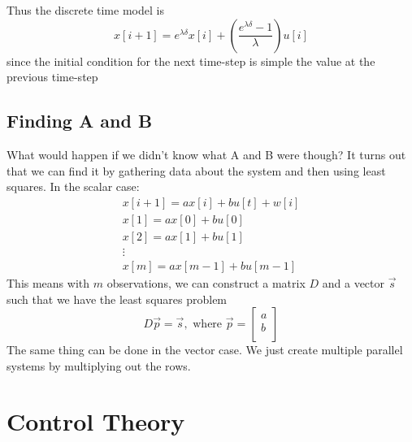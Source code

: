 \documentclass{article}
\begin{document}
Thus the discrete time model is
$$x[i+1]=e^{\lambda \delta}x[i]+\left(
    \frac{e^{\lambda \delta}-1}{\lambda}\right) u[i]$$
since the initial condition for the next time-step is simple the value at the previous time-step

\subsection{Finding A and B}
What would happen if we didn't know what A and B were though? It turns out that we can find it by gathering data about the system and then using least squares.
In the scalar case:
\[
    \begin{array}{c}
        x[i+1]=ax[i]+bu[t]+w[i]\\
        x[1]=ax[0]+bu[0]\\
        x[2]=ax[1]+bu[1]\\
        \vdots\\
        x[m]=ax[m-1]+bu[m-1]
    \end{array}
\]
This means with $m$ observations, we can construct a matrix $D$ and a vector $\vec{s}$ such that we have the least squares problem
\[
    D\vec{p}=\vec{s},\text{ where } \vec{p}=
\left[
    \begin{array}{c}
        a\\
        b\\
    \end{array}
\right]
\]
The same thing can be done in the vector case. We just create multiple parallel systems by multiplying out the rows.
\section{Control Theory}
\end{document}
